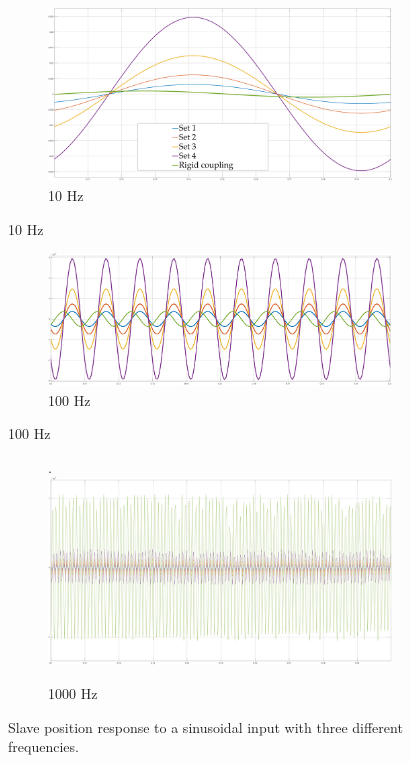 \begin{figure}[h]
	\begin{subfigure}[h!]{1\linewidth}
		\centering
		\includegraphics[width=\textwidth, height=0.40\textwidth]{Images/vibr10Htz}
		\caption{10 Hz}
		\label{fig:10Htz}
	\end{subfigure}
\end{figure}
\begin{figure}\ContinuedFloat
	\begin{subfigure}[h!]{1\linewidth}
		\centering
		\includegraphics[width=\textwidth, height=0.45\textwidth]{Images/vibr100Htz}
		\caption{100 Hz}
		\label{fig:100Htz}
	\end{subfigure}
\end{figure}
\begin{figure}\ContinuedFloat
	\begin{subfigure}[h!]{1\linewidth}
		\centering.
		\includegraphics[width=\textwidth, height=0.45\textwidth]{Images/vibr1000Htz}
		\caption{1000 Hz}
		\label{fig:1000Htz}
	\end{subfigure}
\caption{Slave position response to a sinusoidal input with three different frequencies.}
\label{positionResponceFrequencies}
\end{figure}

